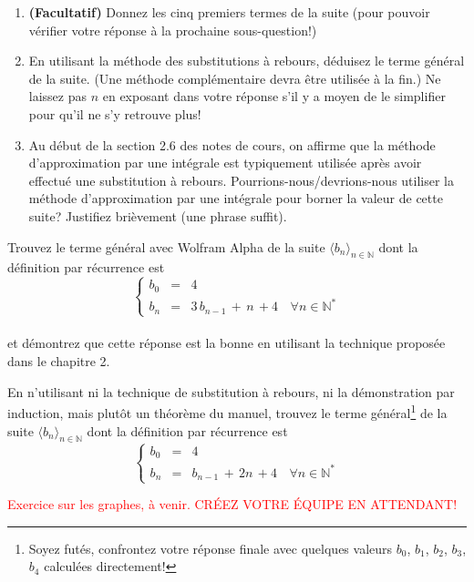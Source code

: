\documentclass[11pt]{article}
\newcommand{\REMISE}[1]{}
\newcommand{\rouge}[1]{\textcolor{red}{#1}}
\newcommand{\ensembleN}{{\mathbb{N}}}  %
\newcounter{exercice}\newcommand{\exercice}{ \bigskip \addtocounter{exercice}{1}\noindent \textbf{Exercice \theexercice}\\}
\newcommand{\reponse}[1]{\REMISE{\vspace{.5cm}\noindent\textbf{Réponse : } #1 \newpage}}
\begin{document}
\begin{enumerate}
 \item \textbf{(Facultatif)} Donnez les cinq premiers termes de la suite (pour pouvoir vérifier votre réponse à la prochaine sous-question!)
 \item En utilisant la méthode des substitutions à rebours, déduisez le terme général de la suite.  (Une méthode complémentaire devra être utilisée à la fin.) Ne laissez pas $n$ en exposant dans votre réponse s'il y a  moyen de le simplifier pour qu'il ne s'y retrouve plus!
\item 
Au début de la section 2.6 des notes de cours, on affirme que la méthode d'approximation par une intégrale est typiquement utilisée après avoir effectué une substitution à rebours.  Pourrions-nous/devrions-nous utiliser la méthode d'approximation par une intégrale pour borner la valeur de cette suite? Justifiez brièvement (une phrase suffit).

\end{enumerate}

\exercice
Trouvez le terme général avec Wolfram Alpha de la suite $\langle b_n\rangle_{n\in\ensembleN}$ dont la définition par récurrence est\\
$$\left\{
\begin{array}{cclr}
  b_0 & = & 4 &  \\
  b_n & = &  3 \,b_{n-1}\,+\,n\,+4 & \, \forall n\in\ensembleN^\ast 
\end{array}\right.$$
%
\\
et démontrez que cette réponse est la bonne en utilisant la technique proposée dans le chapitre 2. 
 
\reponse{
}


\exercice
En n'utilisant ni la technique de substitution à rebours, ni la démonstration par induction, mais plutôt un théorème du manuel, trouvez le terme général\footnote{Soyez futés, confrontez votre réponse finale avec quelques valeurs $b_0$, $b_1$, $b_2$, $b_3$, $b_4$ calculées directement!} de la suite $\langle b_n\rangle_{n\in\ensembleN}$ dont la
définition
par récurrence est
$$\left\{
\begin{array}{cclr}
  b_0 & = & 4 &  \\
  b_n & = &  b_{n-1}\,+\,2n\,+ 4 & \, \forall n\in\ensembleN^\ast 
\end{array}%
\right.$$

\reponse{
}
\exercice
\rouge{Exercice sur les graphes, à venir. CRÉEZ VOTRE ÉQUIPE EN ATTENDANT!}
\end{document}
